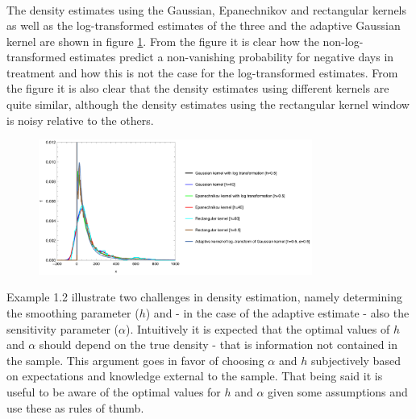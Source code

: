 \documentclass[
twoside,
openright,
titlepage,
numbers=noenddot,
headinclude,%
footinclude=true,
dottedtoc, %
ngerman,
american, %
pagesize=pdftex,
]{book}
\begin{document}
\begin{example}
\begin{equation}
\begin{split}
			\end{split}
		\end{equation}
		The density estimates using the Gaussian, Epanechnikov and rectangular kernels as well as the log-transformed estimates of the three and the adaptive Gaussian kernel are shown in figure \ref{fig:1}. From the figure it is clear how the non-log-transformed estimates predict a non-vanishing probability for negative days in treatment and how this is not the case for the log-transformed estimates. From the figure it is also clear that the density estimates using different kernels are quite similar, although the density estimates using the rectangular kernel window is noisy relative to the others.
		\begin{figure}[H]
			\centering
			\captionsetup{width=0.95\textwidth}
			\includegraphics[width=0.8\textwidth]{figures/P11.pdf}
			\caption{}
			\label{fig:1}
		\end{figure}
	\end{example}
	\noindent Example 1.2 illustrate two challenges in density estimation, namely determining the smoothing parameter ($h$) and - in the case of the adaptive estimate - also the sensitivity parameter ($\alpha$). Intuitively it is expected that the optimal values of $h$ and $\alpha$ should depend on the true density - that is information not contained in the sample. This argument goes in favor of choosing $\alpha$ and $h$ subjectively based on expectations and knowledge external to the sample. That being said it is useful to be aware of the optimal values for $h$ and $\alpha$ given some assumptions and use these as rules of thumb. 
	
\end{document}
